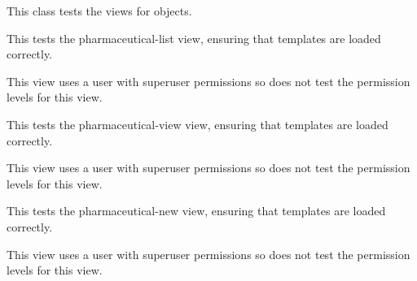 \documentclass[letterpaper,10pt,english]{sphinxmanual}
\begin{document}

\begin{fulllineitems}
\label{data:mousedb.data.tests.PharmaceuticalViewTests}
This class tests the views for {\hyperref[data:mousedb.data.models.Pharmaceutical]{}} objects.

\begin{fulllineitems}
\label{data:mousedb.data.tests.PharmaceuticalViewTests.test_pharmaceutical_list}
This tests the pharmaceutical-list view, ensuring that templates are loaded correctly.

This view uses a user with superuser permissions so does not test the permission levels for this view.

\end{fulllineitems}


\begin{fulllineitems}
\label{data:mousedb.data.tests.PharmaceuticalViewTests.test_pharmaceutical_view}
This tests the pharmaceutical-view view, ensuring that templates are loaded correctly.

This view uses a user with superuser permissions so does not test the permission levels for this view.

\end{fulllineitems}


\begin{fulllineitems}
\label{data:mousedb.data.tests.PharmaceuticalViewTests.test_pharmaceutical_view_create}
This tests the pharmaceutical-new view, ensuring that templates are loaded correctly.

This view uses a user with superuser permissions so does not test the permission levels for this view.

\end{fulllineitems}


\end{fulllineitems}
\end{document}

